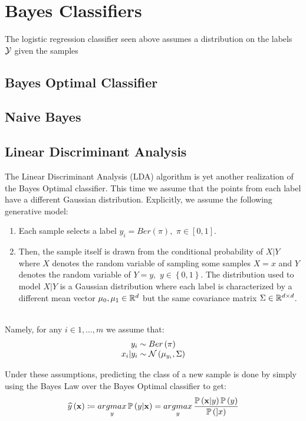 \section{Bayes Classifiers}
The logistic regression classifier seen above assumes a distribution on the labels $\mathcal{Y}$ given the samples  

\subsection{Bayes Optimal Classifier}

\subsection{Naive Bayes}

\subsection{Linear Discriminant Analysis}
The Linear Discriminant Analysis (LDA) algorithm is yet another realization of the Bayes Optimal classifier. This time we assume that the points from each label have a different Gaussian distribution. Explicitly, we assume the following generative model: 
\begin{enumerate}
	\item Each sample selects a label $y_i=Ber\left(\pi\right),\,\,\pi\in\left[0,1\right]$.
	\item Then, the sample itself is drawn from the conditional probability of $X|Y$ where $X$ denotes the random variable of sampling some samples $X=x$ and $Y$ denotes the random variable of $Y=y,\,\,y\in\left\{0,1\right\}$. The distribution used to model $X|Y$ is a Gaussian distribution where each label is characterized by a different mean vector $\mu_0,\mu_1\in\mathbb{R}^d$ but the same covariance matrix $\Sigma\in\mathbb{R}^{d\times d}$.
\end{enumerate}~\\
Namely, for any $i\in 1,\ldots,m$ we assume that:
$$
\begin{array}{c}
	y_i \sim Ber\left(\pi\right) \\
	x_i|y_i \sim \mathcal{N}\left(\mu_{y_i},\Sigma\right)
\end{array}
$$

Under these assumptions, predicting the class of a new sample is done by simply using the Bayes Law over the Bayes Optimal classifier to get:
$$ \widehat{y}\left(\mathbf{x}\right) \coloneqq \underset{y}{argmax}\,\mathbb{P}\left(y|\mathbf{x}\right) = \underset{y}{argmax}\,\frac{\mathbb{P}\left(\mathbf{x}|y\right)\mathbb{P}\left(y\right)}{\mathbb{P}\left(]x\right)} $$

